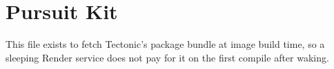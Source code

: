 \documentclass[11pt]{article}
\begin{document}
\section*{Pursuit Kit}
This file exists to fetch Tectonic's package bundle at image build time, so a sleeping Render
service does not pay for it on the first compile after waking.
\end{document}
